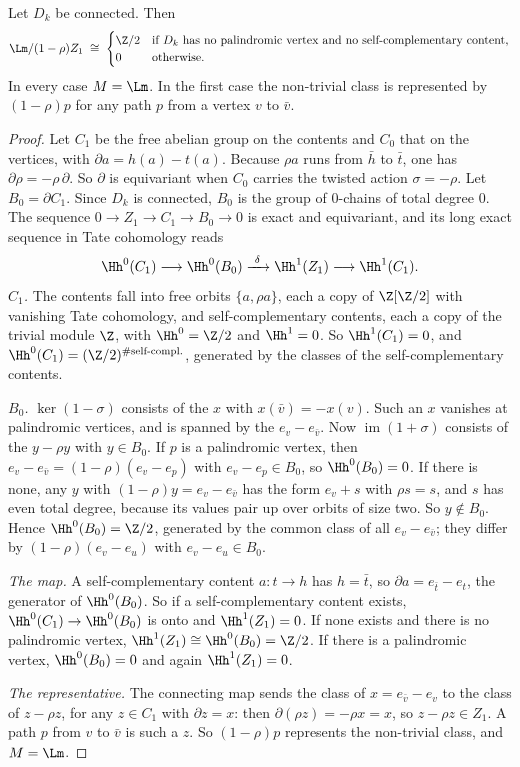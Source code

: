 \begin{theorem}\label{ch11:thm:tate}
Let $D_k$ be connected. Then
\[
\Lm/(1-\rho)Z_1\;\cong\;\begin{cases}\Z/2&\text{if $D_k$ has no palindromic vertex and no
self-complementary content,}\\ 0&\text{otherwise.}\end{cases}
\]
In every case $M=\Lm$. In the first case the non-trivial class is represented by $(1-\rho)p$ for any
path $p$ from a vertex $v$ to $\bar v$.
\end{theorem}

\begin{proof}
Let $C_1$ be the free abelian group on the contents and $C_0$ that on the vertices, with
$\partial a=h(a)-t(a)$. Because $\rho a$ runs from $\bar h$ to $\bar t$, one has
$\partial\rho=-\rho\,\partial$. So $\partial$ is equivariant when $C_0$ carries the twisted action
$\sigma=-\rho$. Let $B_0=\partial C_1$. Since $D_k$ is connected, $B_0$ is the group of $0$-chains of
total degree $0$. The sequence $0\to Z_1\to C_1\to B_0\to0$ is exact and equivariant, and its long exact
sequence in Tate cohomology reads
\[
\Hh^0(C_1)\longrightarrow\Hh^0(B_0)\xrightarrow{\ \delta\ }\Hh^1(Z_1)\longrightarrow\Hh^1(C_1).
\]
\emph{$C_1$.} The contents fall into free orbits $\{a,\rho a\}$, each a copy of $\Z[\Z/2]$ with vanishing
Tate cohomology, and self-complementary contents, each a copy of the trivial module $\Z$, with
$\Hh^0=\Z/2$ and $\Hh^1=0$. So $\Hh^1(C_1)=0$, and $\Hh^0(C_1)=(\Z/2)^{\#\text{self-compl.}}$, generated by
the classes of the self-complementary contents.

\emph{$B_0$.} $\ker(1-\sigma)$ consists of the $x$ with $x(\bar v)=-x(v)$. Such an $x$ vanishes at palindromic
vertices, and is spanned by the $e_v-e_{\bar v}$. Now $\operatorname{im}(1+\sigma)$ consists of the
$y-\rho y$ with $y\in B_0$. If $p$ is a palindromic vertex, then $e_v-e_{\bar v}=(1-\rho)(e_v-e_p)$ with
$e_v-e_p\in B_0$, so $\Hh^0(B_0)=0$. If there is none, any $y$ with $(1-\rho)y=e_v-e_{\bar v}$ has the form
$e_v+s$ with $\rho s=s$, and $s$ has even total degree, because its values pair up over orbits of size
two. So $y\notin B_0$. Hence $\Hh^0(B_0)=\Z/2$, generated by the common class of all $e_v-e_{\bar v}$;
they differ by $(1-\rho)(e_v-e_u)$ with $e_v-e_u\in B_0$.

\emph{The map.} A self-complementary content $a\colon t\to h$ has $h=\bar t$, so
$\partial a=e_{\bar t}-e_t$, the generator of $\Hh^0(B_0)$. So if a self-complementary content exists,
$\Hh^0(C_1)\to\Hh^0(B_0)$ is onto and $\Hh^1(Z_1)=0$. If none exists and there is no palindromic vertex,
$\Hh^1(Z_1)\cong\Hh^0(B_0)=\Z/2$. If there is a palindromic vertex, $\Hh^0(B_0)=0$ and again
$\Hh^1(Z_1)=0$.

\emph{The representative.} The connecting map sends the class of $x=e_{\bar v}-e_v$ to the class of
$z-\rho z$, for any $z\in C_1$ with $\partial z=x$: then $\partial(\rho z)=-\rho x=x$, so $z-\rho z\in Z_1$. A
path $p$ from $v$ to $\bar v$ is such a $z$. So $(1-\rho)p$ represents the non-trivial class, and $M=\Lm$.
\end{proof}


